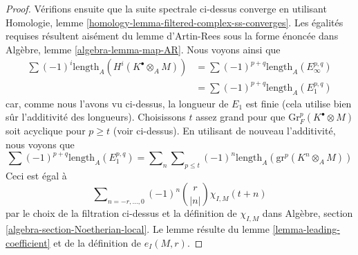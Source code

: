 \begin{proof}
\medskip\noindent
Vérifions ensuite que la suite spectrale ci-dessus converge
en utilisant Homologie, lemme \ref{homology-lemma-filtered-complex-ss-converges}.
Les égalités requises résultent aisément du lemme d'Artin-Rees
sous la forme énoncée dans Algèbre, lemme \ref{algebra-lemma-map-AR}.
Nous voyons ainsi que
\begin{align*}
\sum (-1)^i\text{length}_A(H^i(K^\bullet \otimes_A M))
& =
\sum (-1)^{p + q} \text{length}_A(E_\infty^{p, q}) \\
& =
\sum (-1)^{p + q} \text{length}_A(E_1^{p, q})
\end{align*}
car, comme nous l'avons vu ci-dessus, la longueur de $E_1$ est finie
(cela utilise bien sûr l'additivité des longueurs). Choisissons $t$ assez
grand pour que $\text{Gr}^p_F(K^\bullet \otimes M)$
soit acyclique pour $p \geq t$ (voir ci-dessus). En utilisant
de nouveau l'additivité, nous voyons que
$$
\sum (-1)^{p + q} \text{length}_A(E_1^{p, q}) =
\sum\nolimits_n \sum\nolimits_{p \leq t}
(-1)^n \text{length}_A(\text{gr}^p(K^n \otimes_A M))
$$
Ceci est égal à
$$
\sum\nolimits_{n = -r, \ldots, 0} (-1)^n{r \choose |n|} \chi_{I, M}(t + n)
$$
par le choix de la filtration ci-dessus et la définition de $\chi_{I, M}$ dans
Algèbre, section \ref{algebra-section-Noetherian-local}.
Le lemme résulte du lemme \ref{lemma-leading-coefficient}
et de la définition de $e_I(M, r)$.
\end{proof}

